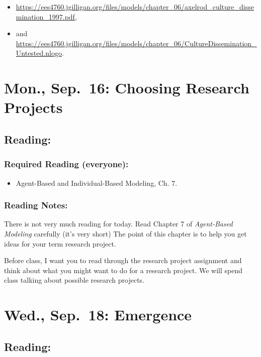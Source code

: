 \documentclass[
]{article}
\providecommand{\tightlist}{%
  \setlength{\itemsep}{0pt}\setlength{\parskip}{0pt}}
\begin{document}
\begin{itemize}
\tightlist
\item
  \url{https://ees4760.jgilligan.org/files/models/chapter_06/axelrod_culture_dissemination_1997.pdf},
\item
  and
  \url{https://ees4760.jgilligan.org/files/models/chapter_06/CultureDissemination_Untested.nlogo}.
\end{itemize}

\section{Mon., Sep.~16: Choosing Research
Projects}\label{mon.-sep.-16-choosing-research-projects}

\subsection{Reading:}\label{reading-7}

\subsubsection{Required Reading
(everyone):}\label{required-reading-everyone-6}

\begin{itemize}
\tightlist
\item
  Agent-Based and Individual-Based Modeling, Ch. 7.
\end{itemize}

\subsubsection{Reading Notes:}\label{reading-notes-6}

There is not very much reading for today. Read Chapter 7 of
\emph{Agent-Based Modeling} carefully (it's very short) The point of
this chapter is to help you get ideas for your term research project.

Before class, I want you to read through the research project assignment
and think about what you might want to do for a research project. We
will spend class talking about possible research projects.

\section{Wed., Sep.~18: Emergence}\label{wed.-sep.-18-emergence}

\subsection{Reading:}\label{reading-8}
\end{document}
